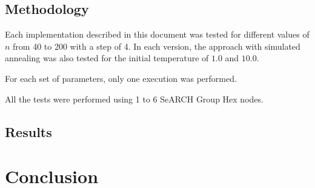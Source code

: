\documentclass[abstract=on,9pt,twocolumn]{scrartcl}
\begin{document}
\subsection{Methodology}
Each implementation described in this document was tested for different values of $n$ from 40 to 200 with a step of 4. In each version, the approach with simulated annealing was also tested for the initial temperature of $1.0$ and $10.0$.

For each set of parameters, only one execution was performed. 

All the tests were performed using 1 to 6 SeARCH Group Hex nodes.

\subsection{Results}

\section{Conclusion}




\end{document}
